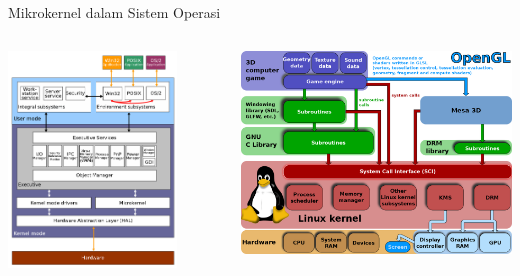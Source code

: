 \documentclass[aspectratio=169, table]{beamer}
\begin{document}
    \begin{frame}{Mikrokernel dalam Sistem Operasi}
    \begin{columns}
        \begin{column}{0.5\textwidth}
            \begin{center}
                \includegraphics[width=0.8\textwidth]{../../images/microkernel0}
            \end{center}
        \end{column}
        \begin{column}{0.5\textwidth}
            \includegraphics[width=\textwidth]{../../images/microkernel1}
        \end{column}
    \end{columns}
\end{frame}
\end{document}
